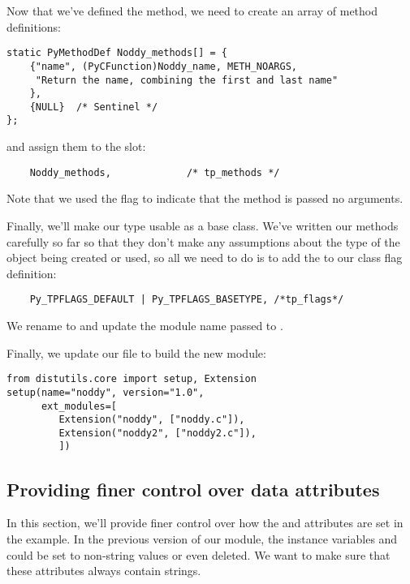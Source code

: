 Now that we've defined the method, we need to create an array of
method definitions:

\begin{verbatim}
static PyMethodDef Noddy_methods[] = {
    {"name", (PyCFunction)Noddy_name, METH_NOARGS,
     "Return the name, combining the first and last name"
    },
    {NULL}  /* Sentinel */
};
\end{verbatim}

and assign them to the  slot:

\begin{verbatim}
    Noddy_methods,             /* tp_methods */
\end{verbatim}

Note that we used the  flag to indicate that the
method is passed no arguments.

Finally, we'll make our type usable as a base class.  We've written
our methods carefully so far so that they don't make any assumptions
about the type of the object being created or used, so all we need to
do is to add the  to our class flag
definition:

\begin{verbatim}
    Py_TPFLAGS_DEFAULT | Py_TPFLAGS_BASETYPE, /*tp_flags*/
\end{verbatim}

We rename  to 
and update the module name passed to .

Finally, we update our  file to build the new module:

\begin{verbatim}
from distutils.core import setup, Extension
setup(name="noddy", version="1.0",
      ext_modules=[
         Extension("noddy", ["noddy.c"]),
         Extension("noddy2", ["noddy2.c"]),
         ])
\end{verbatim}

\subsection{Providing finer control over data attributes}

In this section, we'll provide finer control over how the
 and  attributes are set in the
 example. In the previous version of our module, the
instance variables  and  could be set to
non-string values or even deleted. We want to make sure that these
attributes always contain strings.


